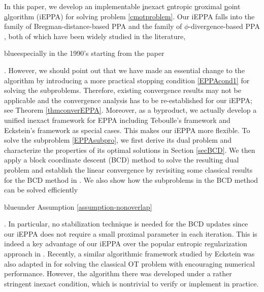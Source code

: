 \documentclass[10pt]{article}
\newcommand{\blue}[1]{\begin{color}{blue}#1\end{color}}
\begin{document}
In this paper, we develop an implementable \underline{i}nexact \underline{e}ntropic \underline{p}roximal \underline{p}oint \underline{a}lgorithm (iEPPA) for solving problem \eqref{cmotproblem}.
Our iEPPA falls into the family of Bregman-distance-based PPA \cite{cz1992proximal,ct1993convergence,e1993nonlinear,e1998approximate} and the family of $\phi$-divergence-based PPA \cite{a1995interior,e1990multiplicative,ist1994entropy,i1995convergence,t1992entropic,t1997convergence}, both of which have been widely studied in the literature,
\blue{especially in the 1990's starting from the paper \cite{cz1992proximal}}.
However, we should point out that we have made an essential change to the algorithm by introducing a more practical stopping condition \eqref{EPPAcond1} for solving the subproblems. Therefore, existing convergence results may not be applicable and the convergence analysis has to be re-established for our iEPPA; see Theorem \ref{thmconverEPPA}. Moreover, as a byproduct, we actually develop a unified inexact framework for EPPA including Teboulle's framework \cite{t1997convergence} and Eckstein's framework \cite{e1998approximate} as special cases. This makes our iEPPA more flexible. To solve the subproblem \eqref{EPPAsubpro}, we first derive its dual problem and characterize the properties of its optimal solutions in Section \ref{secBCD}.
We then apply a block coordinate descent (BCD) method to solve the resulting dual problem and establish the linear convergence by revisiting some classical results for the BCD method in \cite{lt1992convergence,lt1993convergence,tseng1993dual}. We also show how the subproblems in the BCD method can be solved efficiently \blue{under Assumption \ref{assumption-nonoverlap}}. In particular, no stabilization technique is needed for the BCD updates since our iEPPA does not require a small proximal parameter in each iteration. This is indeed a key advantage of our iEPPA over the popular entropic regularization approach in \cite{bccnp2015iterative}. Recently, a similar algorithmic framework studied by Eckstein \cite{e1998approximate} was also adapted in \cite{xie2018fast} for solving the classical OT problem with encouraging numerical performance. However, the algorithm there was developed under a rather stringent inexact condition, which is nontrivial to verify or implement in practice.
\end{document}
